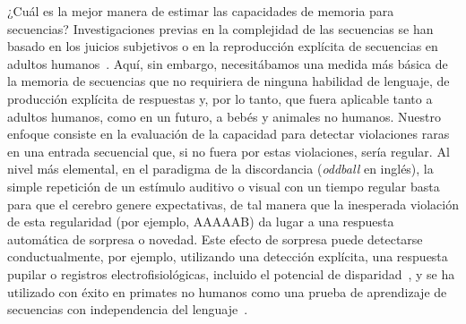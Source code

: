¿Cuál es la mejor manera de estimar las capacidades de memoria para secuencias? Investigaciones previas en la complejidad de las secuencias se han basado en los juicios subjetivos o en la reproducción explícita de secuencias en adultos humanos~\cite{f61}. Aquí, sin embargo, necesitábamos una medida más básica de la memoria de secuencias que no requiriera de ninguna habilidad de lenguaje, de producción explícita de respuestas y, por lo tanto, que fuera aplicable tanto a adultos humanos, como en un futuro, a bebés y animales no humanos. Nuestro enfoque consiste en la evaluación de la capacidad para detectar violaciones raras en una entrada secuencial que, si no fuera por estas violaciones, sería regular. Al nivel más elemental, en el paradigma de la discordancia ({\em oddball} en inglés), la simple repetición de un estímulo auditivo o visual con un tiempo regular basta para que el cerebro genere expectativas, de tal manera que la inesperada violación de esta regularidad (por ejemplo, AAAAAB) da lugar a una respuesta automática de sorpresa o novedad. Este efecto de sorpresa puede detectarse conductualmente, por ejemplo, utilizando una detección explícita, una respuesta pupilar o registros electrofisiológicas, incluido el potencial de disparidad~\cite{f62,f63,f64}, y se ha utilizado con éxito en primates no humanos como una prueba de aprendizaje de secuencias con independencia del lenguaje~\cite{f5,f65,f66}.


